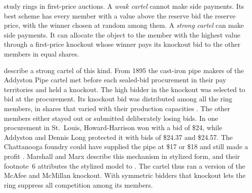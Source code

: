 \citet{McAfeeMcMillan1992} study rings in first-price auctions.
A \emph{weak cartel} cannot make side payments. Its best scheme has every member with a value above
the reserve bid the reserve price, with the winner chosen at random among them. A \emph{strong
cartel} can make side payments. It can allocate the object to the member with the highest value
through a first-price knockout whose winner pays its knockout bid to the other members in equal
shares.

\citet[ch.~9, pp.~191--192]{MarshallMarx2012} describe a strong cartel of this kind. From 1895 the
cast-iron pipe makers of the Addyston Pipe cartel met before each sealed-bid procurement in their pay
territories and held a knockout. The high bidder in the knockout was selected to bid at the
procurement. Its knockout bid was distributed among all the ring members, in shares that varied with
their production capacities \citep[p.~191, footnote~7]{MarshallMarx2012}. The other members either stayed
out or submitted deliberately losing bids. In one procurement in St.~Louis, Howard-Harrison won with a
bid of \$24, while Addyston and Dennis Long protected it with bids of \$24.37 and \$24.57. The
Chattanooga foundry could have supplied the pipe at \$17 or \$18 and still made a profit
\citep[p.~192]{MarshallMarx2012}. Marshall and Marx describe this mechanism in stylized form, and
their footnote~6 attributes the stylized model to \citet{McAfeeMcMillan1992}. The cartel thus ran a
version of the McAfee and McMillan knockout. With symmetric bidders that knockout lets the ring suppress
all competition among its members.

